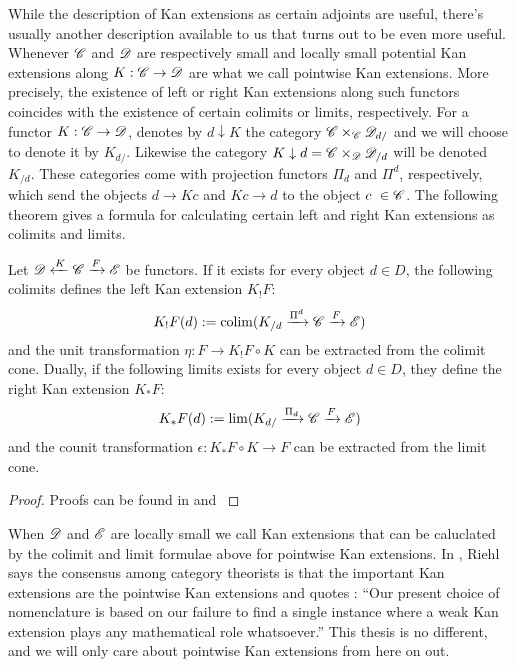 \documentclass[../../thesis.tex]{subfiles}
\begin{document}
While the description of Kan extensions as certain adjoints are useful, there's usually another description available to us that turns out to be even more useful.
Whenever $\mathscr{C}$ and $\mathscr{D}$ are respectively small and locally small potential Kan extensions along $K: \mathscr{C} \to \mathscr{D}$ are what we call pointwise Kan extensions.
More precisely, the existence of left or right Kan extensions along such functors coincides with the existence of certain colimits or limits, respectively.
For a functor $K:\mathscr{C} \to \mathscr{D}$, \cite{MacLane} denotes by $d \downarrow K$ the category $\mathscr{C} \times_{\mathscr{C}}\mathscr{D}_{d/}$ and we will choose to denote it by $K_{d/}$.
Likewise the category $K \downarrow d = \mathscr{C} \times_{\mathscr{D}}\mathscr{D}_{/d}$ will be denoted $K_{/d}$.
These categories come with projection functors $\Pi_d$ and $\Pi^d$, respectively, which send the objects $d\to Kc$ and $Kc \to d$ to the object $c \in \C$.
The following theorem gives a formula for calculating certain left and right Kan extensions as colimits and limits.
\begin{theorem}\label{ptwiseKan}
    Let $\mathscr{D} \xleftarrow{K} \mathscr{C} \xrightarrow{F} \mathscr{E}$ be functors.
    If it exists for every object $d\in D$, the following colimits defines the left Kan extension $K_!F$:
    \[
        K_!F(d) : = \operatorname{colim}(K_{/d} \xrightarrow{\Pi^d}\mathscr{C}\xrightarrow{F}\mathscr{E})
    \]
    and the unit transformation $\eta: F \to K_!F\circ K$ can be extracted from the colimit cone.
    Dually, if the following limits exists for every object $d\in D$, they define the right Kan extension $K_*F$:
    \[
        K_*F(d) : = \lim(K_{d/} \xrightarrow{\Pi_d}\mathscr{C} \xrightarrow{F} \mathscr{E})
    \]
    and the counit transformation $\epsilon: K_*F\circ K \to F$ can be extracted from the limit cone.
\end{theorem}
\begin{proof}
    Proofs can be found in \cite[Theorem 6.2.1.]{CatContext} and \cite[Theorem X.3.1.]{MacLane}
\end{proof}
When $\mathscr{D}$ and $\mathscr{E}$ are locally small we call Kan extensions that can be caluclated by the colimit and limit formulae above for pointwise Kan extensions.
In \cite{CatContext}, Riehl says the consensus among category theorists is that the important Kan extensions are the pointwise Kan extensions and quotes \cite[§4]{Kelly}:
``Our present choice of nomenclature is based on our failure to find a single instance where a weak Kan extension plays any mathematical role whatsoever.''
This thesis is no different, and we will only care about pointwise Kan extensions from here on out.
\end{document}
